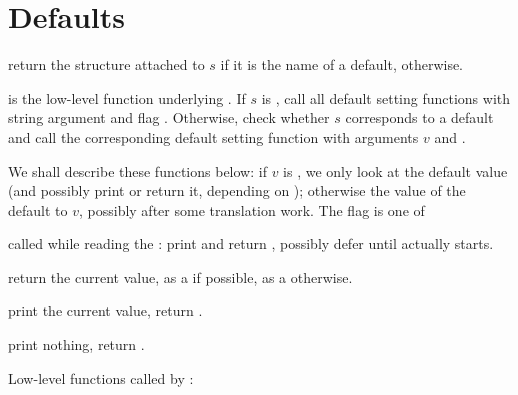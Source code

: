 \section{Defaults}

 return the 
structure attached to $s$ if it is the name of a default, 
otherwise.

 is the
low-level function underlying . If $s$ is , call all
default setting functions with string argument  and flag
. Otherwise, check whether $s$ corresponds to a default
and call the corresponding default setting function with arguments $v$ and
\fl.

We shall describe these functions below: if $v$ is , we only look
at the default value (and possibly print or return it, depending on
); otherwise the value of the default to $v$, possibly after some
translation work. The flag is one of

\item {} called while reading the : print and return
, possibly defer until  actually starts.

\item {} return the current value, as a  if possible, as
a  otherwise.

\item {} print the current value, return .

\item {} print nothing, return .

\noindent Low-level functions called by :










